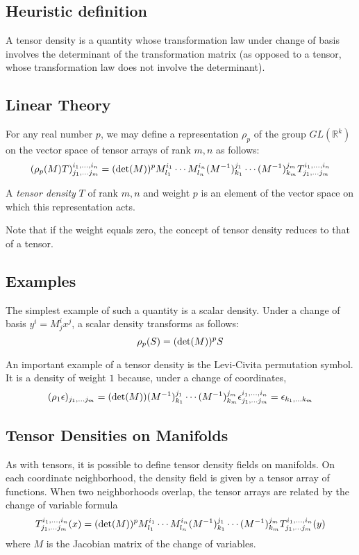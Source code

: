 \documentclass[12pt]{article}
\begin{document}
\subsection{Heuristic definition}

A tensor density is a quantity whose transformation law under change of basis involves the determinant of the transformation matrix (as opposed to a tensor, whose transformation law does not involve the determinant).  

\subsection{Linear Theory}

For any real number $p$, we may define a representation $\rho_p$ of the group $GL(\mathbb{R}^k)$ on the vector space of tensor arrays of rank $m,n$ as follows:
 $$(\rho_p (M) T)^{i_1, \ldots, i_n}_{j_1, \ldots j_m} = (\mathop{\rm det}(M))^p M^{i_1}_{l_1} \cdots M^{i_n}_{l_n} (M^{-1})_{k_1}^{j_1} \cdots (M^{-1})_{k_m}^{j_m} T^{i_1, \ldots, i_n}_{j_1, \ldots j_m}$$

A \emph{tensor density} $T$ of rank $m,n$ and weight $p$ is an element of the vector space on which this representation acts.

Note that if the weight equals zero, the concept of tensor density reduces to that of a tensor.

\subsection{Examples}

The simplest example of such a quantity is a scalar density.  Under a change of basis $y^i = M^i_j x^j$, a scalar density transforms as follows:
 $$\rho_p (S) = (\mathop{\rm det}(M))^p S$$

An important example of a tensor density is the Levi-Civita permutation symbol.  It is a density of weight $1$ because, under a change of coordinates,
 $$(\rho_1 \epsilon)_{j_1, \ldots j_m} = (\mathop{\rm det}(M))  (M^{-1})_{k_1}^{j_1} \cdots (M^{-1})_{k_m}^{j_m} \epsilon^{i_1, \ldots, i_n}_{j_1, \ldots j_m} = \epsilon_{k_1, \ldots k_m}$$

\subsection{Tensor Densities on Manifolds}

As with tensors, it is possible to define tensor density fields on manifolds.  On each coordinate neighborhood, the density field is given by a tensor array of functions.  When two neighborhoods overlap, the tensor arrays are related by the change of variable formula
 $$T^{i_1, \ldots, i_n}_{j_1, \ldots j_m} (x) = (\mathop{\rm det}(M))^p M^{i_1}_{l_1} \cdots M^{i_n}_{l_n} (M^{-1})_{k_1}^{j_1} \cdots (M^{-1})_{k_m}^{j_m} T^{i_1, \ldots, i_n}_{j_1, \ldots j_m} (y)$$
where $M$ is the Jacobian matrix of the change of variables.
\end{document}
